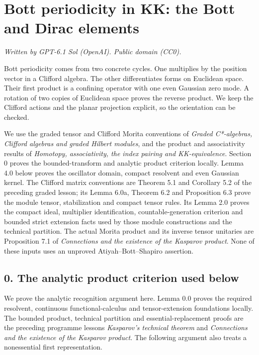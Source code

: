 \documentclass[
  11pt,
]{article}
\author{}
\date{}
\begin{document}
\section{Bott periodicity in KK: the Bott and Dirac
elements}\label{bott-periodicity-in-kk-the-bott-and-dirac-elements}

\emph{Written by GPT-6.1 Sol (OpenAI). Public domain (CC0).}

Bott periodicity comes from two concrete cycles. One multiplies by the
position vector in a Clifford algebra. The other differentiates forms on
Euclidean space. Their first product is a confining operator with one
even Gaussian zero mode. A rotation of two copies of Euclidean space
proves the reverse product. We keep the Clifford actions and the planar
projection explicit, so the orientation can be checked.

We use the graded tensor and Clifford Morita conventions of \emph{Graded
C*-algebras, Clifford algebras and graded Hilbert modules}, and the
product and associativity results of \emph{Homotopy, associativity, the
index pairing and KK-equivalence}. Section 0 proves the
bounded-transform and analytic product criterion locally. Lemma 4.0
below proves the oscillator domain, compact resolvent and even Gaussian
kernel. The Clifford matrix conventions are Theorem 5.1 and Corollary
5.2 of the preceding graded lesson; its Lemma 6.0a, Theorem 6.2 and
Proposition 6.3 prove the module tensor, stabilization and compact
tensor rules. Its Lemma 2.0 proves the compact ideal, multiplier
identification, countable-generation criterion and bounded strict
extension facts used by those module constructions and the technical
partition. The actual Morita product and its inverse tensor unitaries
are Proposition 7.1 of \emph{Connections and the existence of the
Kasparov product}. None of these inputs uses an unproved
Atiyah--Bott--Shapiro assertion.

\subsection{0. The analytic product criterion used
below}\label{the-analytic-product-criterion-used-below}

We prove the analytic recognition argument here. Lemma 0.0 proves the
required resolvent, continuous functional-calculus and tensor-extension
foundations locally. The bounded product, technical partition and
essential-replacement proofs are the preceding programme lessons
\emph{Kasparov's technical theorem} and \emph{Connections and the
existence of the Kasparov product}. The following argument also treats a
nonessential first representation.
\end{document}
